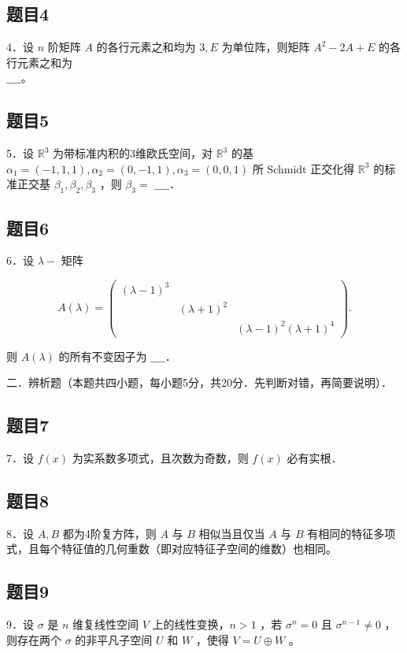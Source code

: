\documentclass{article}
\begin{document}
\subsection{题目4}
4．设 \(n\) 阶矩阵 \(A\) 的各行元素之和均为 \(3, E\) 为单位阵，则矩阵 \(A^{2}-2 A+E\) 的各行元素之和为\\
\(\_\_\_\_\)。

\subsection{题目5}
5．设 \(\mathbb{R}^{3}\) 为带标准内积的3维欧氏空间，对 \(\mathbb{R}^{3}\) 的基 \(\alpha_{1}=(-1,1,1), \alpha_{2}=(0,-1,1), \alpha_{3}=(0,0,1)\) 所 Schmidt 正交化得 \(\mathbb{R}^{3}\) 的标准正交基 \(\beta_{1}, \beta_{2}, \beta_{3}\) ，则 \(\beta_{3}=\) \(\_\_\_\_\)．

\subsection{题目6}
6．设 \(\lambda-\) 矩阵

\[
A(\lambda)=\left(\begin{array}{lll}
(\lambda-1)^{3} & & \\
& (\lambda+1)^{2} & \\
& & (\lambda-1)^{2}(\lambda+1)^{4}
\end{array}\right) .
\]

则 \(A(\lambda)\) 的所有不变因子为 \(\_\_\_\_\)．

二．辨析题（本题共四小题，每小题5分，共20分．先判断对错，再简要说明）．\\

\subsection{题目7}
7．设 \(f(x)\) 为实系数多项式，且次数为奇数，则 \(f(x)\) 必有实根．

\subsection{题目8}
8．设 \(A, B\) 都为4阶复方阵，则 \(A\) 与 \(B\) 相似当且仅当 \(A\) 与 \(B\) 有相同的特征多项式，且每个特征值的几何重数（即对应特征子空间的维数）也相同。

\subsection{题目9}
9．设 \(\sigma\) 是 \(n\) 维复线性空间 \(V\) 上的线性变换，\(n>1\) ，若 \(\sigma^{n}=0\) 且 \(\sigma^{n-1} \neq 0\) ，则存在两个 \(\sigma\) 的非平凡子空间 \(U\) 和 \(W\) ，使得 \(V=U \oplus W\) 。
\end{document}
